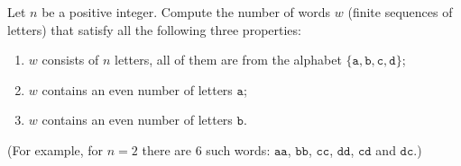 \documentclass{article}
\begin{document}
\setlength{\parindent}{0pt}
Let \(\displaystyle n\) be a positive integer. Compute the number of words \(\displaystyle w\) (finite sequences of letters) that satisfy all the following three properties:
\begin{enumerate}[label=(\arabic*)]
\item \(\displaystyle w\) consists of \(\displaystyle n\) letters, all of them are from the alphabet \(\displaystyle \{\texttt{a},\texttt{b},\texttt{c},\texttt{d}\}\);
\item \(\displaystyle w\) contains an even number of letters  \(\displaystyle \texttt{a}\);
\item \(\displaystyle w\) contains an even number of letters  \(\displaystyle \texttt{b}\).
\end{enumerate}
(For example, for \(\displaystyle n=2\) there are \(\displaystyle 6\) such words: \(\displaystyle \texttt{aa}\), \(\displaystyle \texttt{bb}\), \(\displaystyle \texttt{cc}\), \(\displaystyle \texttt{dd}\), \(\displaystyle \texttt{cd}\) and \(\displaystyle \texttt{dc}\).)
\end{document}

